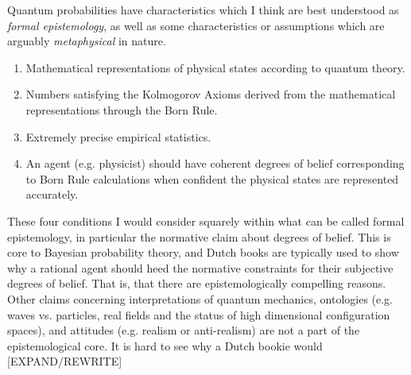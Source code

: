 Quantum probabilities have characteristics which I think are best understood as \emph{formal epistemology}, as well as some characteristics or assumptions which are arguably \emph{metaphysical} in nature.  



\begin{enumerate}
    \item Mathematical representations of physical states according to quantum theory.
    \item Numbers satisfying the Kolmogorov Axioms derived from the mathematical representations through the Born Rule.
    \item Extremely precise empirical statistics.
    \item An agent (e.g. physicist) should have coherent degrees of belief corresponding to Born Rule calculations when confident the physical states are represented accurately.
\end{enumerate}



These four conditions I would consider squarely within what can be called formal epistemology, in particular the normative claim about degrees of belief.  This is core to Bayesian probability theory, and Dutch books are typically used to show why a rational agent should heed the normative constraints for their subjective degrees of belief.  That is, that there are epistemologically compelling reasons.  Other claims concerning interpretations of quantum mechanics, ontologies (e.g. waves vs. particles, real fields and the status of high dimensional configuration spaces), and attitudes (e.g. realism or anti-realism) are not a part of the epistemological core.  It is hard to see why a Dutch bookie would  [EXPAND/REWRITE]

